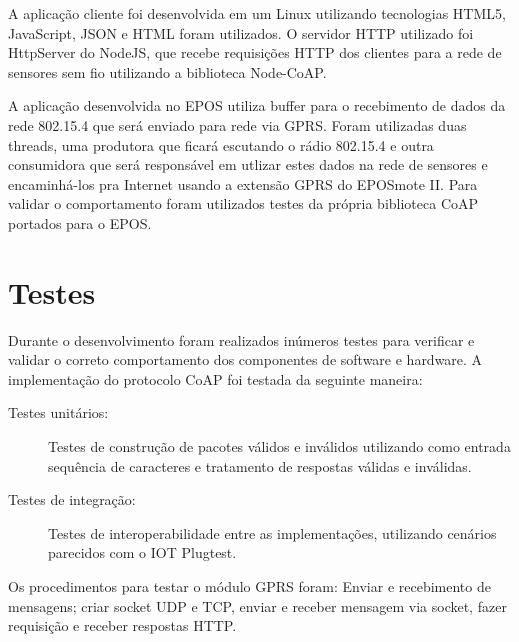 A aplica\c{c}\~ao cliente foi desenvolvida em um Linux utilizando tecnologias HTML5, JavaScript, JSON e HTML foram utilizados. O servidor HTTP utilizado foi HttpServer do NodeJS, que recebe requisi\c{c}\~oes HTTP dos clientes para a rede de sensores sem fio utilizando a biblioteca Node-CoAP.

A aplica\c{c}\~ao desenvolvida no EPOS utiliza buffer para o recebimento de dados da rede 802.15.4 que ser\'a enviado para rede via GPRS. Foram utilizadas duas threads, uma produtora que ficar\'a escutando o r\'adio 802.15.4 e outra consumidora que ser\'a respons\'avel em utlizar estes dados na rede de sensores e encaminh\'a-los pra Internet usando a extens\~ao GPRS do EPOSmote II. Para validar o comportamento foram utilizados testes da pr\'opria biblioteca CoAP portados para o EPOS.

\section{Testes}

Durante o desenvolvimento foram realizados in\'umeros testes para verificar e validar o correto comportamento dos componentes de software e hardware.  A implementa\c{c}\~ao do protocolo CoAP foi testada da seguinte maneira:

\begin{description}
    \item[Testes unit\'arios:] Testes de constru\c{c}\~ao de pacotes v\'alidos e inv\'alidos utilizando como entrada sequ\^encia de caracteres e tratamento de respostas v\'alidas e inv\'alidas.
    \item[Testes de integra\c{c}\~ao:] Testes de interoperabilidade entre as implementa\c{c}\~oes, utilizando cen\'arios parecidos com o IOT Plugtest.
\end{description}

Os procedimentos para testar o m\'odulo GPRS foram: Enviar e recebimento de mensagens; criar socket UDP e TCP, enviar e receber mensagem via socket, fazer requisi\c{c}\~ao e receber respostas HTTP.
